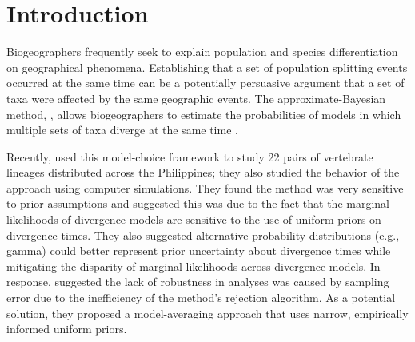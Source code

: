 \section{Introduction}
Biogeographers frequently seek to explain population and species
differentiation on geographical phenomena.
Establishing that a set of population splitting events occurred
at the same time can be a potentially persuasive argument that a set of taxa
were affected by the same geographic events.
The approximate-Bayesian method, \msb, allows biogeographers to estimate the
probabilities of models in which multiple sets of taxa diverge at the same
time \citep{Hickerson2006,Huang2011}.

Recently, \citet{Oaks2012} used this model-choice framework to study 22 pairs
of vertebrate lineages distributed across the Philippines; they also studied
the behavior of the \msb approach using computer simulations.
They found the method was very sensitive to prior assumptions and suggested
this was due to the fact that the marginal likelihoods of divergence models are
sensitive to the use of uniform priors on divergence times.
They also suggested alternative probability distributions (e.g., gamma) could
better represent prior uncertainty about divergence times while mitigating the
disparity of marginal likelihoods across divergence models.
In response, \citet{Hickerson2013} suggested the lack of robustness in \msb
analyses was caused by sampling error due to the inefficiency of the method's
rejection algorithm.
As a potential solution, they proposed a model-averaging approach that uses
narrow, empirically informed uniform priors.

